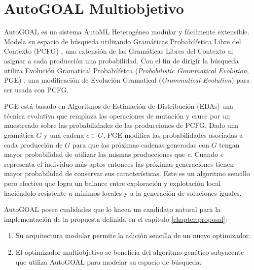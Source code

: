 \chapter{AutoGOAL Multiobjetivo}\label{chapter:implementation}
AutoGOAL  es un sistema AutoML Heterog\'eneo modular y f\'acilmente extensible. Modela su espacio de b\'usqueda utilizando Gram\'aticas Probabil\'istica  Libre del Contexto (PCFG) , una extensi\'on de las Gram\'aticas Libres del Contexto al asignar a cada producci\'on una probabilidad. Con el fin de dirigir la b\'usqueda utiliza Evoluci\'on Gramatical Probabil\'istca (\textit{Probabilistic Grammatical Evolution}, PGE) , una modificaci\'on de Evoluci\'on Gramatical (\textit{Grammatical Evolution}) 
para ser usada con PCFG.

PGE est\'a basado en Algoritmos de Estimaci\'on de Distribuci\'on (EDAs)  una t\'ecnica evolutiva que remplaza las operaciones de mutaci\'on y cruce por un muestreado sobre las probabilidades de las producciones de PCFG. Dado una gram\'atica $G$ y una cadena $c \in G$, PGE modifica las probabilidades asociadas a cada producci\'on de $G$ para que las pr\'oximas cadenas generadas con $G$ tengan mayor probabilidad de utilizar las mismas producciones que $c$. Cuando $c$ representa el individuo m\'as aptos entonces las pr\'oximas generaciones tienen mayor probabilidad de conservar sus caracter\'isticas.
Este es un algoritmo sencillo pero efectivo que logra un balance entre exploraci\'on y explotaci\'on local haci\'endolo resistente a m\'inimos locales y a la generaci\'on de soluciones iguales.

AutoGOAL posee cualidades que lo hacen un candidato natural para la implementaci\'on de la propuesta definida en el cap\'itulo \ref{chapter:proposal}:
\begin{enumerate}
    \item Su arquitectura modular permite la adici\'on sencilla  de un nuevo optimizador. 
    \item El optimizador multiobjetivo se beneficia del algoritmo gen\'etico subyacente que utiliza AutoGOAL para modelar su espacio de b\'usqueda. 
\end{enumerate}

